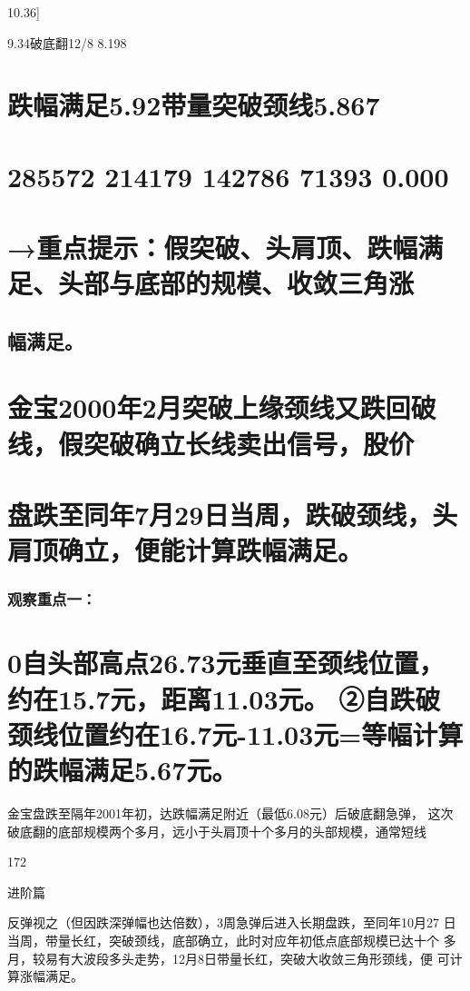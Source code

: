 \documentclass{article}
\begin{document}
10.36]

9.34破底翻12/8 8.198

\section{跌幅满足5.92带量突破颈线5.867}

\section{285572 214179 142786 71393 0.000}

\section{→重点提示：假突破、头肩顶、跌幅满足、头部与底部的规模、收敛三角涨}

\subsection{幅满足。}

\section{金宝2000年2月突破上缘颈线又跌回破线，假突破确立长线卖出信号，股价}

\section{盘跌至同年7月29日当周，跌破颈线，头肩顶确立，便能计算跌幅满足。}

\subsubsection{观察重点一：}

\section{0自头部高点26.73元垂直至颈线位置，约在15.7元，距离11.03元。 ②自跌破颈线位置约在16.7元-11.03元=等幅计算的跌幅满足5.67元。}

金宝盘跌至隔年2001年初，达跌幅满足附近（最低6.08元）后破底翻急弹， 这次破底翻的底部规模两个多月，远小于头肩顶十个多月的头部规模，通常短线

172

\clearpage

进阶篇

反弹视之（但因跌深弹幅也达倍数），3周急弹后进入长期盘跌，至同年10月27 日当周，带量长红，突破颈线，底部确立，此时对应年初低点底部规模已达十个 多月，较易有大波段多头走势，12月8日带量长红，突破大收敛三角形颈线，便 可计算涨幅满足。
\end{document}
